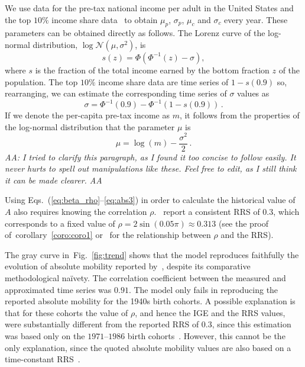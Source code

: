 \documentclass[12pt,a4paper]{article}
\newcommand{\red}[1]{{\color{red} #1}}
\newcommand{\creflong}[1]{corollary~\ref{coro:#1}}
\newcommand{\AAA}[1]{\red{{\it AA: #1 AA}}}
\newcommand{\fref}[1]{Fig.~\ref{fig:#1}}
\newcommand{\be}{\begin{equation}}
\newcommand{\ee}{\end{equation}}
\numberwithin{equation}{section}
\begin{document}
We use data for the pre-tax national income per adult in the United States and the top $10\%$ income share data~\citep{WID2017} to obtain $\mu_p$, $\sigma_p$, $\mu_c$ and $\sigma_c$ every year. These parameters can be obtained directly as follows. The Lorenz curve of the log-normal distribution, $\log{\mathcal{N}}\left(\mu,\sigma^2\right)$, is~~\citep{cowell2011measuring}
\be
s(z) = \Phi\left(\Phi^{-1}\left(z\right)-\sigma\right),
\ee
where $s$ is the fraction of the total income earned by the bottom fraction $z$ of the population. The top $10\%$ income share data are time series of $1-s(0.9)$ so, rearranging, we can estimate the corresponding time series of $\sigma$ values as
\be
\sigma = \Phi^{-1}\left(0.9\right) - \Phi^{-1}\left(1-s(0.9)\right)\,.
\ee
If we denote the per-capita pre-tax income as $m$, it follows from the properties of the log-normal distribution that the parameter $\mu$ is
\be
\mu = \log{\left(m\right)} - \frac{\sigma^2}{2}\,.
\ee
\AAA{I tried to clarify this paragraph, as I found it too concise to follow easily. It never hurts to spell out manipulations like these. Feel free to edit, as I still think it can be made clearer.}

Using Eqs.~(\ref{eq:beta_rho}--\ref{eq:abs3}) in order to calculate the historical value of $A$ also requires knowing the correlation $\rho$.~\citet{chetty2014united} report a consistent RRS of $0.3$, which corresponds to a fixed value of $\rho=2\sin{\left(0.05\pi\right)}\approx0.313$ (see the proof of~\creflong{coro1} or~\citet{trivedi2007copula} for the relationship between $\rho$ and the RRS).

The gray curve in~\fref{trend} shows that the model reproduces faithfully the evolution of absolute mobility reported by~\citet{chetty2017fading}, despite its comparative methodological na\"{i}vety. The correlation coefficient between the measured and approximated time series was $0.91$. The model only fails in reproducing the reported absolute mobility for the 1940s birth cohorts. A possible explanation is that for these cohorts the value of $\rho$, and hence the IGE and the RRS values, were substantially different from the reported RRS of $0.3$, since this estimation was based only on the $1971$--$1986$ birth cohorts~\citep{chetty2014united}. However, this cannot be the only explanation, since the quoted absolute mobility values are also based on a time-constant RRS~\citep{chetty2017fading}.
\end{document}
